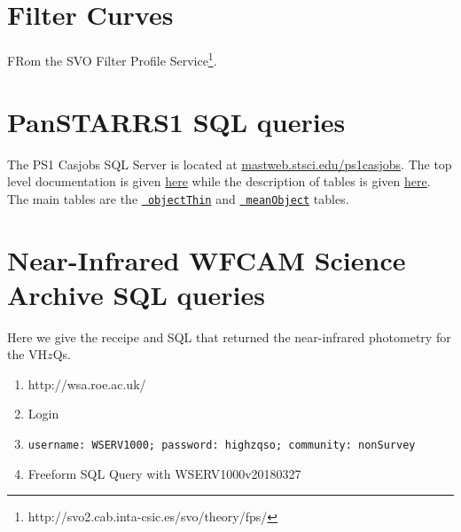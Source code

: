 \documentclass[usenatbib]{mnras}
\begin{document}
\appendix
\section{Filter Curves} 
FRom the SVO Filter Profile Service\footnote{http://svo2.cab.inta-csic.es/svo/theory/fps/}.


\section{PanSTARRS1 SQL queries}\label{sec:PS1_SQL}
The PS1 Casjobs SQL Server is located at
\href{http://mastweb.stsci.edu/ps1casjobs}{mastweb.stsci.edu/ps1casjobs}.
The top level documentation is given
\href{https://outerspace.stsci.edu/display/PANSTARRS/PS1+Source+extraction+and+catalogs}{here}
while the description of tables is given
\href{https://outerspace.stsci.edu/display/PANSTARRS/PS1+Source+extraction+and+catalogs#PS1Sourceextractionandcatalogs}{here}. The
main tables are the
\href{https://outerspace.stsci.edu/display/PANSTARRS/PS1+ObjectThin+table+fields}{{\tt
objectThin}} and
\href{https://outerspace.stsci.edu/display/PANSTARRS/PS1+MeanObject+table+fields}{{\tt
meanObject}} tables.

\section{Near-Infrared WFCAM Science Archive SQL queries}\label{sec:SQL}
Here we give the receipe and SQL that returned the near-infrared photometry 
for the VH$z$Qs. 

\begin{enumerate}
\item http://wsa.roe.ac.uk/ 
\item Login
\item {\tt username:	WSERV1000;  password: 	highzqso;   community: 	nonSurvey} 
\item Freeform SQL Query with  WSERV1000v20180327
\end{enumerate}











%


\end{document}
